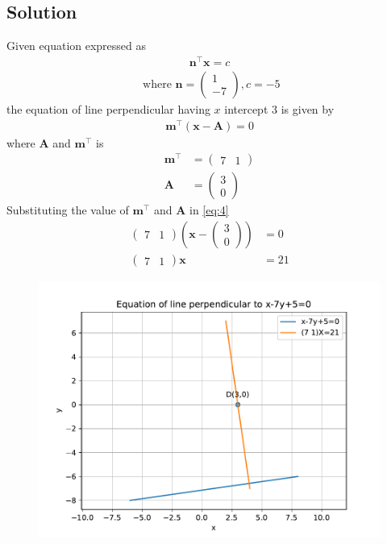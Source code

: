 \documentclass[12pt]{article}
\providecommand{\brak}[1]{\ensuremath{\left(#1\right)}}
\newcommand{\myvec}[1]{\ensuremath{\begin{pmatrix}#1\end{pmatrix}}}
\let\vec\mathbf
\begin{document}
\begin{enumerate}
\section{Solution}Given equation expressed as  
\begin{align}
	\vec{n}^{\top}\vec{x}=c
\end{align}
\begin{align}
	\text{ where }
		\vec{n} = \myvec{1\\-7}, c=-5 
\end{align}
the equation of line perpendicular having $x$ intercept $3$ is given by 
\begin{align}
	\vec{m}^\top\brak{\vec{x}-\vec{A}}=0
\end{align}
		where $\vec{A}$ and $\vec{m}^{\top}$ is 
\begin{align}
	\vec{m}^{\top} &=\myvec{7 & 1}\\
	\vec{A} &=\myvec{3\\0}
\end{align}
Substituting the value of $\vec{m}^{\top}$ and $\vec{A}$ in \eqref{eq:4}
		\begin{align}
			\myvec{7 & 1}\brak{\vec{x}-\myvec{3\\0}} &=0\\
			\myvec{7 & 1}\vec{x} &= 21
		\end{align}
		\begin{figure}[!h]
\begin{center}
\includegraphics[width=\columnwidth]{figs/fig.pdf}
\end{center}
\caption{}
\label{fig:Fig1}
\end{figure}
\end{enumerate}
\end{document}
